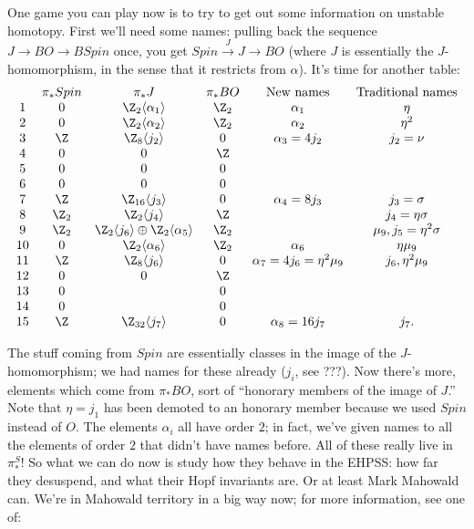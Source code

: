 One game you can play now is to try to get out some information on unstable homotopy.  First we'll need some names: pulling back the sequence $J \to BO \to BSpin$ once, you get $Spin \stackrel{J}{\to} J \to BO$ (where $J$ is essentially the $J$-homomorphism, in the sense that it restricts from $\alpha$).  It's time for another table:
\[
\begin{array}{cccccc}
& \pi_* Spin & \pi_* J & \pi_* BO & \hbox{New names} & \hbox{Traditional names} \\
1 & 0 & \Z_2 \langle \alpha_1 \rangle & \Z_2 & \alpha_1 & \eta \\
2 & 0 & \Z_2 \langle \alpha_2 \rangle & \Z_2 & \alpha_2 & \eta^2 \\
3 & \Z & \Z_8 \langle j_2  \rangle & 0 & \alpha_3 = 4 j_2 & j_2 = \nu \\
4 & 0 & 0 & \Z \\
5 & 0 & 0 & 0 \\
6 & 0 & 0 & 0 \\
7 & \Z & \Z_{16} \langle j_3 \rangle & 0 & \alpha_4 = 8j_3 & j_3 = \sigma \\
8 & \Z_2 & \Z_2 \langle j_4 \rangle & \Z & & j_4 = \eta \sigma \\
9 & \Z_2 & \Z_2 \langle j_6 \rangle \oplus \Z_2 \langle \alpha_5 \rangle & \Z_2 & & \mu_9, j_5 = \eta^2 \sigma \\
10 & 0 & \Z_2 \langle \alpha_6 \rangle & \Z_2 & \alpha_6 & \eta \mu_9 \\
11 & \Z & \Z_8 \langle j_6 \rangle & 0 & \alpha_7 = 4 j_6 = \eta^2 \mu_9 & j_6, \eta^2 \mu_9 \\
12 & 0 & 0 & \Z \\
13 & 0 & & 0 \\
14 & 0 & & 0 \\
15 & \Z & \Z_{32} \langle j_7 \rangle & 0 & \alpha_8 = 16j_7 & j_7.
\end{array}
\]

The stuff coming from $Spin$ are essentially classes in the image of the $J$-homomorphism; we had names for these already ($j_i$, see ???).  Now there's more, elements which come from $\pi_* BO$, sort of ``honorary members of the image of $J$.''  Note that $\eta = j_1$ has been demoted to an honorary member because we used $Spin$ instead of $O$.  The elements $\alpha_i$ all have order $2$; in fact, we've given names to all the elements of order $2$ that didn't have names before.  All of these really live in $\pi_*^S$!  So what we can do now is study how they behave in the EHPSS: how far they desuspend, and what their Hopf invariants are.  Or at least Mark Mahowald can.  We're in Mahowald territory in a big way now; for more information, see one of:

